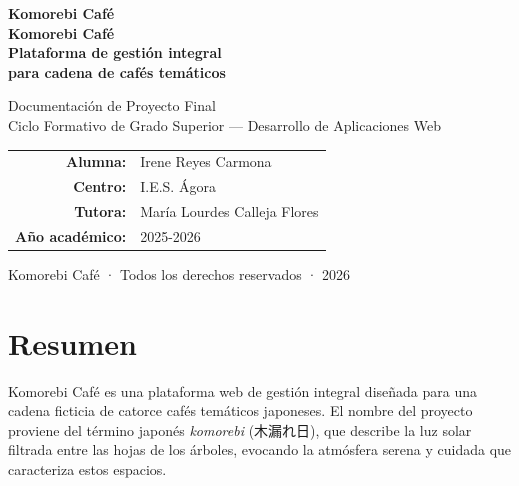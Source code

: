 \documentclass[12pt,a4paper,twoside,openright]{report}
\begin{document}
\begin{titlepage}
  \centering
  \vspace*{1.5cm}

  {\fontsize{28}{32}\selectfont\color{komorebi}\bfseries Komorebi Café}\\[1.5cm]

  {\fontsize{22}{26}\selectfont\bfseries\color{komorebi-dark}
    Komorebi Café\\[0.4cm]
    \fontsize{18}{22}\selectfont\mdseries
    Plataforma de gestión integral\\
    para cadena de cafés temáticos\\[2cm]}

  {\large Documentación de Proyecto Final\\[0.3cm]
   Ciclo Formativo de Grado Superior —
   Desarrollo de Aplicaciones Web}\\[2.5cm]

  \begin{tabular}{rl}
    \textbf{Alumna:}         & Irene Reyes Carmona\\[4pt]
    \textbf{Centro:}         & I.E.S. Ágora\\[4pt]
    \textbf{Tutora:}         & María Lourdes Calleja Flores\\[4pt]
    \textbf{Año académico:}  & 2025-2026\\
  \end{tabular}

  \vfill

  {\small\color{gray} Komorebi Café · Todos los derechos reservados · 2026}
\end{titlepage}

\pagestyle{plain}

\chapter*{Resumen}

Komorebi Café es una plataforma web de gestión integral diseñada para una cadena ficticia
de catorce cafés temáticos japoneses. El nombre del proyecto proviene del término japonés
\textit{komorebi} (木漏れ日), que describe la luz solar filtrada entre las hojas de los
árboles, evocando la atmósfera serena y cuidada que caracteriza estos espacios.
\end{document}
